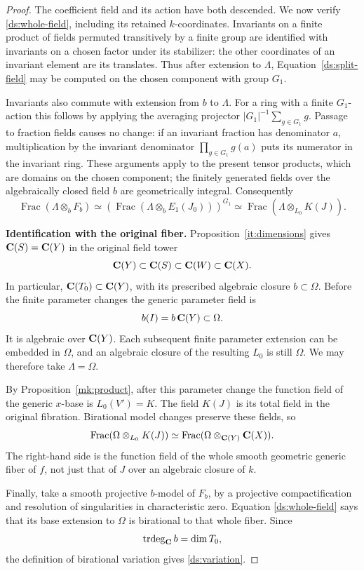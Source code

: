 \begin{proof}
The coefficient field and its action have both descended. We now
verify \eqref{ds:whole-field}, including its retained $k$-coordinates.  Invariants on a finite product
of fields permuted transitively by a finite group are identified
with invariants on a chosen factor under its stabilizer: the
other coordinates of an invariant element are its translates.
Thus after extension to $\Lambda$, Equation~\eqref{ds:split-field}
may be computed on the chosen component
with group $G_1$.

Invariants also commute with extension from $b$ to $\Lambda$.
For a ring with a finite $G_1$-action this follows by applying the
averaging projector $|G_1|^{-1}\sum_{g\in G_1}g$.  Passage to
fraction fields causes no change: if an invariant fraction has
denominator $a$, multiplication by the invariant denominator
$\prod_{g\in G_1}g(a)$ puts its numerator in the invariant ring.
These arguments apply to the present tensor products, which are
domains on the chosen component; the finitely generated fields
over the algebraically closed field $b$ are geometrically
integral.  Consequently
\[
 \operatorname{Frac}(\Lambda\otimes_b F_b)
  \simeq
 \left(
   \operatorname{Frac}(\Lambda\otimes_b E_1(J_0))
 \right)^{G_1}
  \simeq
 \operatorname{Frac}(\Lambda\otimes_{L_0}K(J)).
\]

\smallskip\noindent\textbf{Identification with the original fiber.}\enspace
Proposition~\ref{it:dimensions} gives $\mathbf C(S)=\mathbf C(Y)$ in the
original field tower
\[
 \mathbf C(Y)\subset\mathbf C(S)\subset\mathbf C(W)\subset\mathbf C(X).
\]
In particular, $\mathbf C(T_0)\subset\mathbf C(Y)$, with its prescribed
algebraic closure $b\subset\Omega$.  Before the finite parameter
changes the generic parameter field is
\[
 b(I)=b\,\mathbf C(Y)\subset\Omega.
\]
It is algebraic over $\mathbf C(Y)$.  Each subsequent finite parameter
extension can be embedded in $\Omega$, and an algebraic closure
of the resulting $L_0$ is still $\Omega$.  We may therefore take
$\Lambda=\Omega$.

By Proposition~\ref{mk:product}, after this parameter change the
function field of the generic $x$-base is $L_0(V')=K$.
The field $K(J)$ is its total field in the original fibration.
Birational model changes preserve these fields, so
\[
 \operatorname{Frac}(\Omega\otimes_{L_0}K(J))
   \simeq
 \operatorname{Frac}
       (\Omega\otimes_{\mathbf C(Y)}\mathbf C(X)).
\]
The right-hand side is the function field of the whole smooth
geometric generic fiber of $f$, not just that of $J$ over an
algebraic closure of $k$.

Finally, take a smooth projective $b$-model of $F_b$, by a
projective compactification and resolution of singularities in
characteristic zero.  Equation \eqref{ds:whole-field} says that
its base extension to $\Omega$ is birational to that whole fiber.
Since
\[
 \operatorname{trdeg}_{\mathbf C}b=\dim T_0,
\]
the definition of birational variation gives
\eqref{ds:variation}.
\end{proof}

